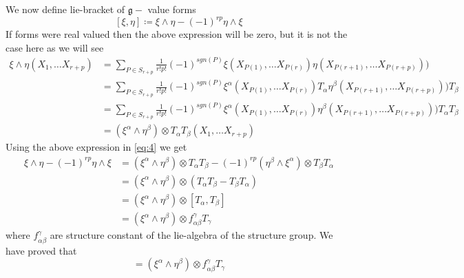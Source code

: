 \documentclass[12pt]{article}
\begin{document}
We now define lie-bracket of $\mathfrak{g}-$ value forms
\begin{equation*}\label{eq:4}
    [\xi, \eta] \coloneqq \xi\wedge\eta - (-1)^{rp} \eta\wedge\xi
\end{equation*}If forms were real valued then the above expression will be zero, but it is not the case here as we will see
\begin{align*}
    \xi\wedge\eta(X_{1}, \dots X_{r+p}) &= \sum_{P\in S_{r+p}}\frac{1}{r!p!}(-1)^{sgn(P)}\xi(X_{P(1)}, \dots X_{P(r)})\eta(X_{P(r+1)}, \dots X_{P(r+p)})) \\
                                        &= \sum_{P\in S_{r+p}}\frac{1}{r!p!}(-1)^{sgn(P)}\xi^{\alpha}(X_{P(1)}, \dots X_{P(r)})T_{\alpha}\eta^{\beta}(X_{P(r+1)}, \dots X_{P(r+p)}))T_{\beta} \\
                                        &= \sum_{P\in S_{r+p}}\frac{1}{r!p!}(-1)^{sgn(P)}\xi^{\alpha}(X_{P(1)}, \dots X_{P(r)})\eta^{\beta}(X_{P(r+1)}, \dots X_{P(r+p)}))T_{\alpha}T_{\beta} \\
                                        &= (\xi^{\alpha}\wedge\eta^{\beta})\otimes T_{\alpha}T_{\beta}(X_{1}, \dots X_{r+p})
\end{align*} Using the above expression in \ref{eq:4} we get
\begin{align*}
    \xi\wedge\eta - (-1)^{rp} \eta\wedge\xi &= (\xi^{\alpha}\wedge\eta^{\beta})\otimes T_{\alpha}T_{\beta} - (-1)^{rp}(\eta^{\beta}\wedge\xi^{\alpha})\otimes T_{\beta}T_{\alpha} \\
                                            &= (\xi^{\alpha}\wedge\eta^{\beta})\otimes(T_{\alpha}T_{\beta} - T_{\beta}T_{\alpha}) \\
                                            &= (\xi^{\alpha}\wedge\eta^{\beta})\otimes [T_{\alpha}, T_{\beta}] \\
                                            &= (\xi^{\alpha}\wedge\eta^{\beta})\otimes f_{\alpha\beta}^{\gamma}T_{\gamma}
\end{align*} where $f_{\alpha\beta}^{\gamma}$ are structure constant of the lie-algebra of the structure group. We have proved that 
\begin{equation*}
    [\xi, \eta] = (\xi^{\alpha}\wedge\eta^{\beta})\otimes f_{\alpha\beta}^{\gamma}T_{\gamma}
\end{equation*}
\end{document}

